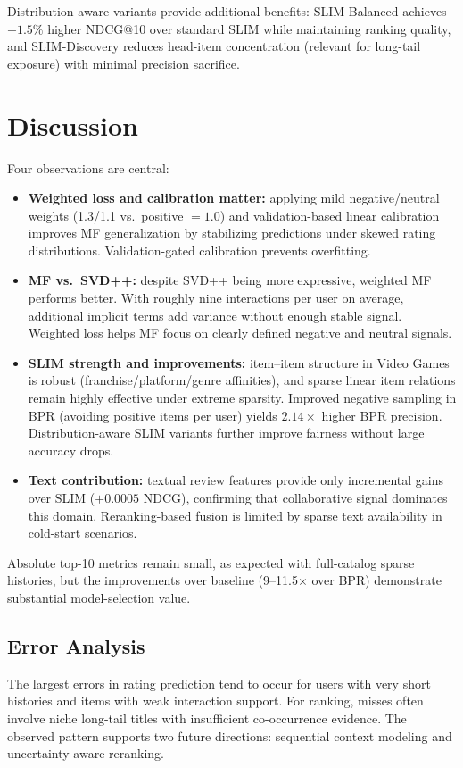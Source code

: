 \documentclass[sigconf,nonacm]{acmart}
\begin{document}
Distribution-aware variants provide additional benefits: SLIM-Balanced achieves $+1.5\%$ higher NDCG@10 over standard SLIM while maintaining ranking quality, and SLIM-Discovery reduces head-item concentration (relevant for long-tail exposure) with minimal precision sacrifice.

\section{Discussion}
Four observations are central:
\begin{itemize}
  \item \textbf{Weighted loss and calibration matter:} applying mild negative/neutral weights (1.3/1.1 vs.\ positive $=1.0$) and validation-based linear calibration improves MF generalization by stabilizing predictions under skewed rating distributions. Validation-gated calibration prevents overfitting.
  \item \textbf{MF vs.\ SVD++:} despite SVD++ being more expressive, weighted MF performs better. With roughly nine interactions per user on average, additional implicit terms add variance without enough stable signal. Weighted loss helps MF focus on clearly defined negative and neutral signals.
  \item \textbf{SLIM strength and improvements:} item--item structure in Video Games is robust (franchise/platform/genre affinities), and sparse linear item relations remain highly effective under extreme sparsity. Improved negative sampling in BPR (avoiding positive items per user) yields $2.14\times$ higher BPR precision. Distribution-aware SLIM variants further improve fairness without large accuracy drops.
  \item \textbf{Text contribution:} textual review features provide only incremental gains over SLIM ($+0.0005$ NDCG), confirming that collaborative signal dominates this domain. Reranking-based fusion is limited by sparse text availability in cold-start scenarios.
\end{itemize}

Absolute top-10 metrics remain small, as expected with full-catalog sparse histories, but the improvements over baseline (9--11.5$\times$ over BPR) demonstrate substantial model-selection value.

\subsection{Error Analysis}
The largest errors in rating prediction tend to occur for users with very short histories and items with weak interaction support. For ranking, misses often involve niche long-tail titles with insufficient co-occurrence evidence. The observed pattern supports two future directions: sequential context modeling and uncertainty-aware reranking.
\end{document}
